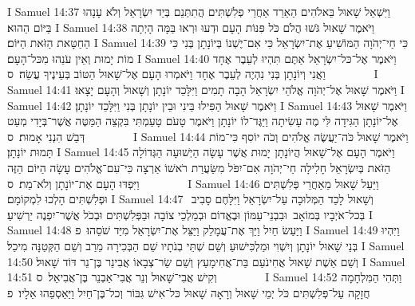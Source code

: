 I Samuel 14:37	וַיִּשְׁאַל שָׁאוּל בֵּאלֹהִים הַאֵרֵד אַחֲרֵי פְלִשְׁתִּים הֲתִתְּנֵם בְּיַד יִשְׂרָאֵל וְלֹא עָנָהוּ בַּיּוֹם הַהוּא׃
I Samuel 14:38	וַיֹּאמֶר שָׁאוּל גֹּשׁוּ הֲלֹם כֹּל פִּנּוֹת הָעָם וּדְעוּ וּרְאוּ בַּמָּה הָיְתָה הַחַטָּאת הַזֹּאת הַיּוֹם׃
I Samuel 14:39	כִּי חַי־יְהֹוָה הַמּוֹשִׁיעַ אֶת־יִשְׂרָאֵל כִּי אִם־יֶשְׁנוֹ בְּיוֹנָתָן בְּנִי כִּי מוֹת יָמוּת וְאֵין עֹנֵהוּ מִכּל־הָעָם׃
I Samuel 14:40	וַיֹּאמֶר אֶל־כּל־יִשְׂרָאֵל אַתֶּם תִּהְיוּ לְעֵבֶר אֶחָד וַאֲנִי וְיוֹנָתָן בְּנִי נִהְיֶה לְעֵבֶר אֶחָד וַיֹּאמְרוּ הָעָם אֶל־שָׁאוּל הַטּוֹב בְּעֵינֶיךָ עֲשֵׂה׃ {ס}        
I Samuel 14:41	וַיֹּאמֶר שָׁאוּל אֶל־יְהֹוָה אֱלֹהֵי יִשְׂרָאֵל הָבָה תָמִים וַיִּלָּכֵד יוֹנָתָן וְשָׁאוּל וְהָעָם יָצָאוּ׃
I Samuel 14:42	וַיֹּאמֶר שָׁאוּל הַפִּילוּ בֵּינִי וּבֵין יוֹנָתָן בְּנִי וַיִּלָּכֵד יוֹנָתָן׃
I Samuel 14:43	וַיֹּאמֶר שָׁאוּל אֶל־יוֹנָתָן הַגִּידָה לִּי מֶה עָשִׂיתָה וַיַּגֶּד־לוֹ יוֹנָתָן וַיֹּאמֶר טָעֹם טָעַמְתִּי בִּקְצֵה הַמַּטֶּה אֲשֶׁר־בְּיָדִי מְעַט דְּבַשׁ הִנְנִי אָמוּת׃ {ס}        
I Samuel 14:44	וַיֹּאמֶר שָׁאוּל כֹּה־יַעֲשֶׂה אֱלֹהִים וְכֹה יוֹסִף כִּי־מוֹת תָּמוּת יוֹנָתָן׃
I Samuel 14:45	וַיֹּאמֶר הָעָם אֶל־שָׁאוּל הֲיוֹנָתָן  יָמוּת אֲשֶׁר עָשָׂה הַיְשׁוּעָה הַגְּדוֹלָה הַזֹּאת בְּיִשְׂרָאֵל חָלִילָה חַי־יְהֹוָה אִם־יִפֹּל מִשַּׂעֲרַת רֹאשׁוֹ אַרְצָה כִּי־עִם־אֱלֹהִים עָשָׂה הַיּוֹם הַזֶּה וַיִּפְדּוּ הָעָם אֶת־יוֹנָתָן וְלֹא־מֵת׃ {ס}        
I Samuel 14:46	וַיַּעַל שָׁאוּל מֵאַחֲרֵי פְּלִשְׁתִּים וּפְלִשְׁתִּים הָלְכוּ לִמְקוֹמָם׃
I Samuel 14:47	וְשָׁאוּל לָכַד הַמְּלוּכָה עַל־יִשְׂרָאֵל וַיִּלָּחֶם סָבִיב  בְּכל־אֹיְבָיו בְּמוֹאָב  וּבִבְנֵי־עַמּוֹן וּבֶאֱדוֹם וּבְמַלְכֵי צוֹבָה וּבַפְּלִשְׁתִּים וּבְכֹל אֲשֶׁר־יִפְנֶה יַרְשִׁיעַ׃
I Samuel 14:48	וַיַּעַשׂ חַיִל וַיַּךְ אֶת־עֲמָלֵק וַיַּצֵּל אֶת־יִשְׂרָאֵל מִיַּד שֹׁסֵהוּ׃ {פ}
I Samuel 14:49	וַיִּהְיוּ בְּנֵי שָׁאוּל יוֹנָתָן וְיִשְׁוִי וּמַלְכִּישׁוּעַ וְשֵׁם שְׁתֵּי בְנֹתָיו שֵׁם הַבְּכִירָה מֵרַב וְשֵׁם הַקְּטַנָּה מִיכַל׃
I Samuel 14:50	וְשֵׁם אֵשֶׁת שָׁאוּל אֲחִינֹעַם בַּת־אֲחִימָעַץ וְשֵׁם שַׂר־צְבָאוֹ אֲבִינֵר בֶּן־נֵר דּוֹד שָׁאוּל׃
I Samuel 14:51	וְקִישׁ אֲבִי־שָׁאוּל וְנֵר אֲבִי־אַבְנֵר בֶּן־אֲבִיאֵל׃ {ס}        
I Samuel 14:52	וַתְּהִי הַמִּלְחָמָה חֲזָקָה עַל־פְּלִשְׁתִּים כֹּל יְמֵי שָׁאוּל וְרָאָה שָׁאוּל כּל־אִישׁ גִּבּוֹר וְכל־בֶּן־חַיִל וַיַּאַסְפֵהוּ אֵלָיו׃ {פ}
